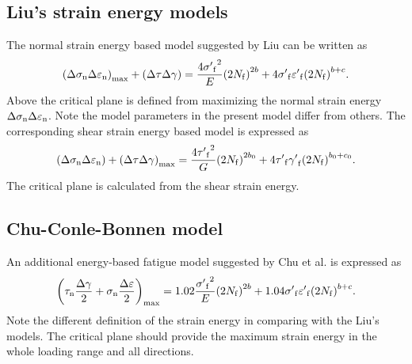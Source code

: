 \subsection{Liu's strain energy models}
\noindent
The normal strain energy based model suggested by Liu \cite{Socie2000} can be written as
\begin{equation}
{\left( {\Delta {\sigma _{\rm n}}\Delta {\varepsilon _{\rm n}}} \right)_{\max }} + \left( {\Delta \tau \Delta \gamma } \right) = \frac{{4{{\sigma '}_{\rm f}}^2}}{E}{\left( {2{N_{\rm f}}} \right)^{2b}} + 4{{\sigma '}_{\rm f}}{{\varepsilon '}_{\rm f}}{\left( {2{N_{\rm f}}} \right)^{b + c}}.
\label{Equ:Liu1_model}
\end{equation}
Above the critical plane is defined from maximizing the normal strain energy ${\Delta {\sigma _{\rm n}}\Delta {\varepsilon _{\rm n}}}$. Note the model parameters in the present model differ from others. The corresponding shear strain energy based model is expressed as
\begin{equation}
\left( {\Delta {\sigma _{\rm n}}\Delta {\varepsilon _{\rm n}}} \right) + {\left( {\Delta \tau \Delta \gamma } \right)_{\max }} = \frac{{4{{\tau '}_{\rm f}}^2}}{G}{\left( {2{N_{\rm f}}} \right)^{2b_0 }} + 4{{\tau '}_{\rm f}}{{\gamma '}_{\rm f}}{\left( {2{N_{\rm f}}} \right)^{b_0  + c_0 }}.
\label{Equ:Liu2_model}
\end{equation}
The critical plane is calculated from the shear strain energy.

\subsection{Chu-Conle-Bonnen model}
\noindent
An additional energy-based fatigue model suggested by Chu et al. \cite{Socie2000} is expressed as
\begin{equation}
{\left( {{\tau _{\rm n}}\frac{{\Delta \gamma }}{2} + {\sigma _{\rm n }}\frac{{\Delta \varepsilon }}{2}} \right)_{\max }} = 1.02\frac{{{{\sigma '}_{\rm f}}^2}}{E}{\left( {2{N_{\rm f}}} \right)^{2b}} + 1.04{{\sigma '}_{\rm f}}{{\varepsilon '}_{\rm f}}{\left( {2{N_{\rm f}}} \right)^{b + c}}.
\label{Equ:CCB_model}
\end{equation}
Note the different definition of the strain energy in comparing with the Liu's models. The critical plane should provide the maximum strain energy in the whole loading range and all directions.

